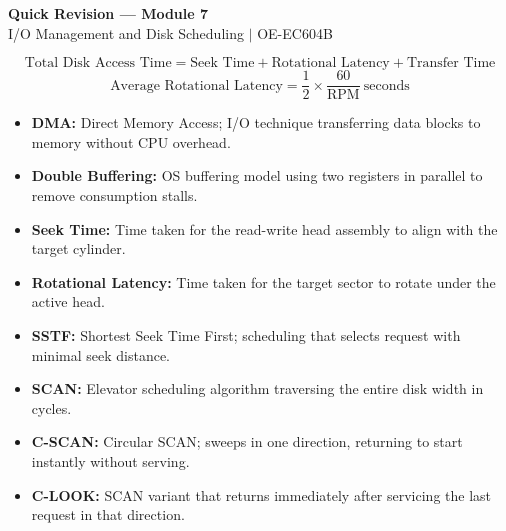 \documentclass[12pt,a4paper]{article}
\begin{document}
\newpage
\begin{center}
  {\large\bfseries\color{myred} Quick Revision --- Module 7}\\[3pt]
  {\small\color{mydark} I/O Management and Disk Scheduling $|$ OE-EC604B}
\end{center}
\noindent{\color{myred}\rule{\linewidth}{1.2pt}}
\vspace{4pt}

\begin{tcolorbox}[formulabox, title={\textbf{Disk Parameter Definitions}}]
$$\text{Total Disk Access Time} = \text{Seek Time} + \text{Rotational Latency} + \text{Transfer Time}$$
$$\text{Average Rotational Latency} = \frac{1}{2} \times \frac{60}{\text{RPM}}\ \text{seconds}$$
\end{tcolorbox}

\begin{tcolorbox}[defbox, title={\textbf{One-Line Definitions}}]
\begin{itemize}[leftmargin=*, itemsep=2.5pt, topsep=0pt]
  \item \textbf{DMA:} Direct Memory Access; I/O technique transferring data blocks to memory without CPU overhead.
  \item \textbf{Double Buffering:} OS buffering model using two registers in parallel to remove consumption stalls.
  \item \textbf{Seek Time:} Time taken for the read-write head assembly to align with the target cylinder.
  \item \textbf{Rotational Latency:} Time taken for the target sector to rotate under the active head.
  \item \textbf{SSTF:} Shortest Seek Time First; scheduling that selects request with minimal seek distance.
  \item \textbf{SCAN:} Elevator scheduling algorithm traversing the entire disk width in cycles.
  \item \textbf{C-SCAN:} Circular SCAN; sweeps in one direction, returning to start instantly without serving.
  \item \textbf{C-LOOK:} SCAN variant that returns immediately after servicing the last request in that direction.
\end{itemize}
\end{tcolorbox}
\end{document}
